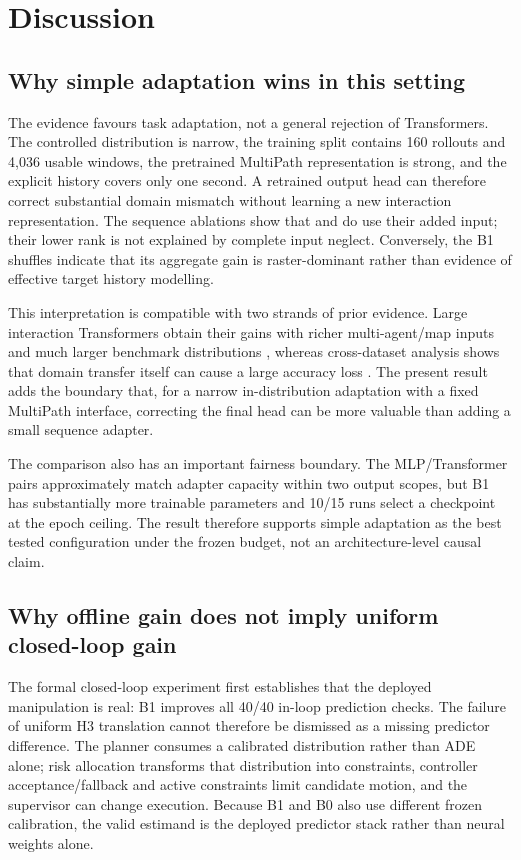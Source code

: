 \section{Discussion}
\label{sec:discussion}

\subsection{Why simple adaptation wins in this setting}

The evidence favours task adaptation, not a general rejection of
Transformers. The controlled distribution is narrow, the training split
contains 160 rollouts and 4,036 usable windows, the pretrained MultiPath
representation is strong, and the explicit history covers only one second. A
retrained output head can therefore correct substantial domain mismatch
without learning a new interaction representation. The sequence ablations
show that \Tone{} and \Ttwo{} do use their added input; their lower rank is not
explained by complete input neglect. Conversely, the B1 shuffles indicate that
its aggregate gain is raster-dominant rather than evidence of effective target
history modelling.

This interpretation is compatible with two strands of prior evidence. Large
interaction Transformers obtain their gains with richer multi-agent/map inputs
and much larger benchmark distributions
\citep{yuan2021agentformer,ngiam2022scene,nayakanti2023wayformer,shi2022mtr},
whereas cross-dataset analysis shows that domain transfer itself can cause a
large accuracy loss \citep{feng2024unitraj}. The present result adds the
boundary that, for a narrow in-distribution adaptation with a fixed MultiPath
interface, correcting the final head can be more valuable than adding a small
sequence adapter.

The comparison also has an important fairness boundary. The MLP/Transformer
pairs approximately match adapter capacity within two output scopes, but B1
has substantially more trainable parameters and 10/15 runs select a checkpoint
at the epoch ceiling. The result therefore supports simple adaptation as the
best tested configuration under the frozen budget, not an architecture-level
causal claim.

\subsection{Why offline gain does not imply uniform closed-loop gain}

The formal closed-loop experiment first establishes that the deployed
manipulation is real: B1 improves all
40/40 in-loop prediction checks. The failure of uniform H3 translation cannot
therefore be dismissed as a missing predictor difference. The planner consumes
a calibrated distribution rather than ADE alone; risk allocation transforms
that distribution into constraints, controller acceptance/fallback and active
constraints limit candidate motion, and the supervisor can change execution. Because B1 and B0 also use
different frozen calibration, the valid estimand is the deployed predictor
stack rather than neural weights alone.

